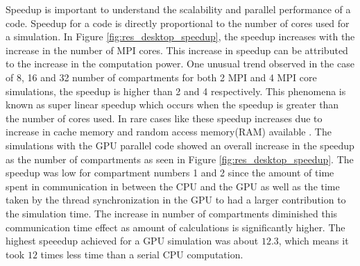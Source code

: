 \documentclass[preprint,10pt,authoryear,review]{elsarticle}
\begin{document}
Speedup is important to understand the scalability and 
parallel performance of a code. Speedup for a code is directly proportional 
to the number of cores used for a simulation. 
In Figure \ref{fig:res_desktop_speedup}, the speedup increases with the increase in 
the number of MPI cores. This increase in speedup can be attributed to the increase 
in the computation power. 
One unusual trend observed in the case of 8, 16 and 32 number of compartments for both 
2 MPI and 4 MPI core simulations, the speedup is higher than 2 and 4 respectively. 
This phenomena is known as super linear speedup which occurs 
when the speedup is greater than the number of cores used. In rare cases like these
speedup increases due to increase in cache memory and random access memory(RAM) 
available \citep{tuncer2009}. The simulations with the GPU parallel code showed an 
overall increase in the speedup as the number of compartments as seen in Figure 
\ref{fig:res_desktop_speedup}. The speedup was low for compartment numbers 1 and 2 
since the amount of time spent in communication in between the CPU and the GPU as well 
as the time taken by the thread synchronization in the GPU to had a larger 
contribution to the simulation time. The increase in number of compartments diminished 
this communication time effect as amount of calculations is significantly higher. The 
highest speeedup achieved for a GPU simulation was about $12.3$, which means it took 
$12$ times less time than a serial CPU computation. 
\end{document}
